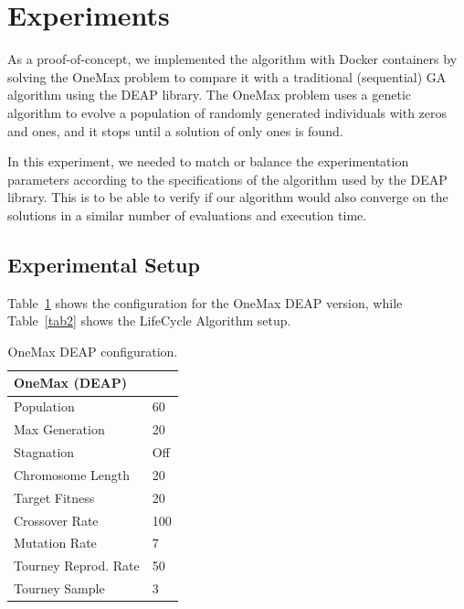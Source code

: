 \documentclass[runningheads]{llncs}
\begin{document}
\section{Experiments} 

As a proof-of-concept, we implemented the algorithm with Docker containers by
solving the OneMax problem to compare it with a traditional (sequential) GA
algorithm using the DEAP library. The OneMax problem uses a genetic algorithm
to evolve a population of randomly generated individuals with zeros and ones,
and it stops until a solution of only ones is found.

In this experiment, we needed to match or balance the experimentation
parameters according to the specifications of the algorithm used by the DEAP
library. This is to be able to verify if our algorithm would also converge on
the solutions in a similar number of evaluations and execution time.

\subsection{Experimental Setup}
    Table~\ref{tab1} shows the configuration for the OneMax DEAP version, while Table~\ref{tab2} shows the LifeCycle Algorithm setup.

    \begin{table}[]
        \centering
        \caption{OneMax DEAP configuration.}\label{tab1}
        \begin{tabular}{|l|l|}
        \hline
        \multicolumn{2}{|l|}{OneMax   (DEAP)} \\ \hline
        Population & 60 \\ \hline
        Max   Generation & 20 \\ \hline
        Stagnation & Off \\ \hline
        Chromosome   Length & 20 \\ \hline
        Target   Fitness & 20 \\ \hline
        Crossover   Rate & 100 \\ \hline
        Mutation   Rate & 7 \\ \hline
        Tourney   Reprod. Rate & 50 \\ \hline
        Tourney   Sample & 3 \\ \hline
        \end{tabular}
        \end{table}
    
\end{document}
